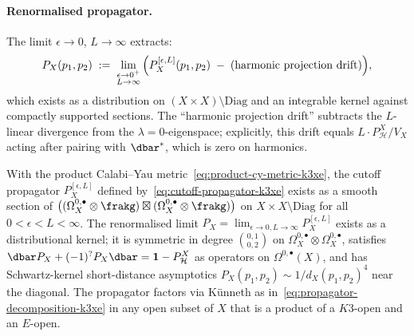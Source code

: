 \paragraph{Renormalised propagator.}
The limit $\epsilon \to 0$, $L \to \infty$ extracts:
\begin{equation}
\label{eq:renormalised-propagator-k3xe}
 P_X(p_1, p_2) \;:=\; \lim_{\substack{\epsilon \to 0^+ \\ L \to \infty}}\, \Bigl( P_X^{[\epsilon, L]}(p_1, p_2) \;-\; (\text{harmonic projection drift}) \Bigr),
\end{equation}
which exists as a distribution on $(X \times X) \setminus \mathrm{Diag}$
and an integrable kernel against compactly supported sections. The
``harmonic projection drift'' subtracts the $L$-linear divergence from
the $\lambda = 0$-eigenspace; explicitly, this drift equals
$L \cdot P_{\mathcal{H}}^X / V_X$ acting after pairing with $\dbar^{*}$,
which is zero on harmonics.

\begin{proposition}
\label{prop:costello-li-propagator-k3xe}
With the product Calabi--Yau metric~\eqref{eq:product-cy-metric-k3xe},
the cutoff propagator $P_X^{[\epsilon, L]}$ defined by~\eqref{eq:cutoff-propagator-k3xe}
exists as a smooth section of $\bigl((\Omega^{0, \bullet}_X \otimes \frakg) \boxtimes (\Omega^{0, \bullet}_X \otimes \frakg)\bigr)$
on $X \times X \setminus \mathrm{Diag}$ for all $0 < \epsilon < L < \infty$.
The renormalised limit $P_X = \lim_{\epsilon \to 0, L \to \infty} P_X^{[\epsilon, L]}$
exists as a distributional kernel; it is symmetric in degree
$\binom{0, 1}{0, 2}$ on $\Omega^{0, \bullet}_X \otimes \Omega^{0, \bullet}_X$,
satisfies $\dbar P_X + (-1)^? P_X \dbar = \mathbf{1} - P_{\mathcal{H}}^X$ as
operators on $\Omega^{0, \bullet}(X)$, and has Schwartz-kernel
short-distance asymptotics $P_X(p_1, p_2) \sim 1/d_X(p_1, p_2)^4$
near the diagonal. The propagator factors via Künneth as in~\eqref{eq:propagator-decomposition-k3xe}
in any open subset of $X$ that is a product of a $K3$-open and an
$E$-open.
\end{proposition}

